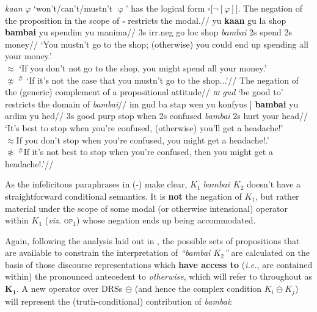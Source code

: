 \a\begingl\glpreamble \textit{kaan} $ \varphi $ `won't/can't/mustn't $ \upvarphi $' has the logical form $ \square\big[\neg[\varphi]\big] $. The negation of the proposition in the scope of $ \square $ restricts the modal.//
 \gla \nogloss{{[$ _\mathit{{K_1}} $}} yu \textbf{kaan} gu la shop  \nogloss{]}  \textbf{bambai} yu spendim yu manima//
\glb 3s \gls{irr}.\gls{neg} go \gls{loc} shop \textsl{bambai} 2s spend 2s money//
\glft `You mustn't go to the shop; (otherwise) you could end up spending all your money.'\trailingcitation{[AJ~23022017]}\\
$ \approx $ `If you don't not go to the shop, you might spend all your money.'\\
$ \not\approx\ ^\#\!{} $ `If it's not the case that you mustn't  go to the shop...'//
\endgl
\a\begingl{}\glpreamble The negation of the (generic) complement of a propositional attitude// \textit{\textsc{bi} gud} `be good to' restricts the domain of \textit{bambai}//
\gla \nogloss{[$ _\mathit{K_1} $} im gud ba stap wen yu konfyus \nogloss] \textbf{bambai} yu ardim yu hed//
\glb 3s good {\sc purp} stop when 2s confused \textsl {bambai} 2s hurt your head//
\glft`It's best to stop when you're confused, (otherwise) you'll get a headache!'\\
$ \approx $If you don't stop when you're confused, you might get a headache!.'\\
$ \not\approx\ ^\#\!{}$If it's not best to stop when you're confused, then you might get a headache!.'//%
\endgl



\xe




As the infelicitous paraphrases in (-) make clear, $ \mathit{K_1}\textit{ bambai }\mathit{K_2}$ doesn't have a straightforward conditional semantics. It is \textbf{not} the negation of $ \mathit{K_1} $, but rather material under the scope of some modal (or otherwise intensional) operator within $ \mathit{K_1} $ (\textit{viz.} \textsc{op$ _1 $}) whose negation ends up being accommodated.



Again, following the analysis laid out in \citet{PhilKotek}, the possible sets of propositions that are available to constrain the interpretation of \textit{``bambai $ K_2 $''} are calculated on the basis of those discourse representations which \textbf{have access to} (\textit{i.e.}, are contained within) the pronounced antecedent to \textit{otherwise}, which will refer to throughout as $ \boldsymbol{K_1} $.
A new operator over DRSs $ \boldsymbol\circleddash$ (and hence the complex condition $ K_i\circleddash K_j$) will represent the (truth-conditional) contribution of \textit{bambai}:%

